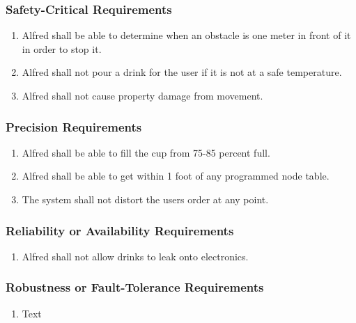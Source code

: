 \documentclass [11pt]{article}
\begin{document}
\subsubsection{Safety-Critical Requirements }
	\begin{enumerate}[label=\textbf{(\roman*)}]
		\item Alfred shall be able to determine when an obstacle is one meter in front of it in order to stop it.
		\item Alfred shall not pour a drink for the user if it is not at a safe temperature. 
		\item Alfred shall not cause property damage from movement.
		
	\end{enumerate}	

\subsubsection{Precision Requirements}
	\begin{enumerate}[label=\textbf{(\roman*)}]
		\item Alfred shall be able to fill the cup from 75-85 percent full.
		\item Alfred shall be able to get within 1 foot of any programmed node table.
		\item The system shall not distort the users order at any point.
	\end{enumerate}

\subsubsection{Reliability or Availability Requirements}
	\begin{enumerate}[label=\textbf{(\roman*)}]
		\item Alfred shall not allow drinks to leak onto electronics.
	\end{enumerate}

\subsubsection{Robustness or Fault-Tolerance Requirements }
	\begin{enumerate}[label=\textbf{(\roman*)}]
		\item Text
	\end{enumerate}
\end{document}
